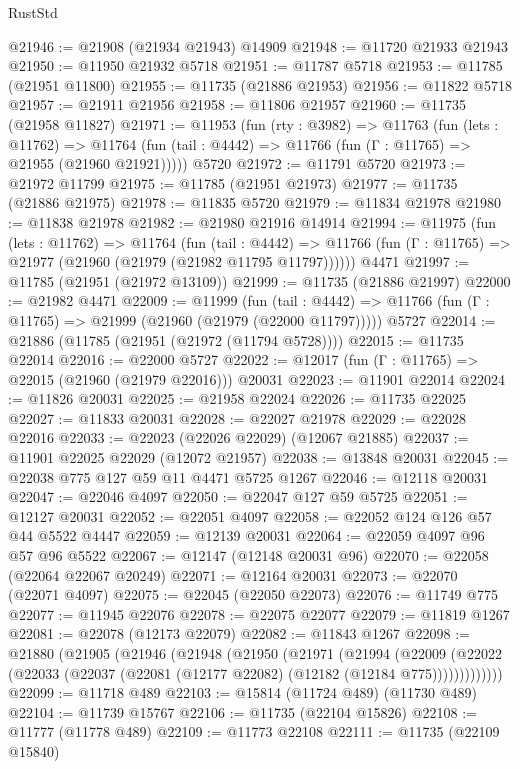 \begin{lexlean}{RustStd}
\begin{coremodule}
@21946 := @21908 (@21934 @21943) @14909
@21948 := @11720 @21933 @21943
@21950 := @11950 @21932 @5718
@21951 := @11787 @5718
@21953 := @11785 (@21951 @11800)
@21955 := @11735 (@21886 @21953)
@21956 := @11822 @5718
@21957 := @21911 @21956
@21958 := @11806 @21957
@21960 := @11735 (@21958 @11827)
@21971 := @11953
    (fun (rty : @3982) =>
    @11763
      (fun (lets : @11762) =>
      @11764 (fun (tail : @4442) => @11766 (fun (Γ : @11765) => @21955 (@21960 @21921)))))
    @5720
@21972 := @11791 @5720
@21973 := @21972 @11799
@21975 := @11785 (@21951 @21973)
@21977 := @11735 (@21886 @21975)
@21978 := @11835 @5720
@21979 := @11834 @21978
@21980 := @11838 @21978
@21982 := @21980 @21916 @14914
@21994 := @11975
    (fun (lets : @11762) =>
    @11764
      (fun (tail : @4442) =>
      @11766 (fun (Γ : @11765) => @21977 (@21960 (@21979 (@21982 @11795 @11797))))))
    @4471
@21997 := @11785 (@21951 (@21972 @13109))
@21999 := @11735 (@21886 @21997)
@22000 := @21982 @4471
@22009 := @11999
    (fun (tail : @4442) => @11766 (fun (Γ : @11765) => @21999 (@21960 (@21979 (@22000 @11797)))))
    @5727
@22014 := @21886 (@11785 (@21951 (@21972 (@11794 @5728))))
@22015 := @11735 @22014
@22016 := @22000 @5727
@22022 := @12017 (fun (Γ : @11765) => @22015 (@21960 (@21979 @22016))) @20031
@22023 := @11901 @22014
@22024 := @11826 @20031
@22025 := @21958 @22024
@22026 := @11735 @22025
@22027 := @11833 @20031
@22028 := @22027 @21978
@22029 := @22028 @22016
@22033 := @22023 (@22026 @22029) (@12067 @21885)
@22037 := @11901 @22025 @22029 (@12072 @21957)
@22038 := @13848 @20031
@22045 := @22038 @775 @127 @59 @11 @4471 @5725 @1267
@22046 := @12118 @20031
@22047 := @22046 @4097
@22050 := @22047 @127 @59 @5725
@22051 := @12127 @20031
@22052 := @22051 @4097
@22058 := @22052 @124 @126 @57 @44 @5522 @4447
@22059 := @12139 @20031
@22064 := @22059 @4097 @96 @57 @96 @5522
@22067 := @12147 (@12148 @20031 @96)
@22070 := @22058 (@22064 @22067 @20249)
@22071 := @12164 @20031
@22073 := @22070 (@22071 @4097)
@22075 := @22045 (@22050 @22073)
@22076 := @11749 @775
@22077 := @11945 @22076
@22078 := @22075 @22077
@22079 := @11819 @1267
@22081 := @22078 (@12173 @22079)
@22082 := @11843 @1267
@22098 := @21880
    (@21905
      (@21946
        (@21948
          (@21950
            (@21971
              (@21994
                (@22009
                  (@22022 (@22033 (@22037 (@22081 (@12177 @22082) (@12182 (@12184 @775)))))))))))))
@22099 := @11718 @489
@22103 := @15814 (@11724 @489) (@11730 @489)
@22104 := @11739 @15767
@22106 := @11735 (@22104 @15826)
@22108 := @11777 (@11778 @489)
@22109 := @11773 @22108
@22111 := @11735 (@22109 @15840)

\end{coremodule}
\end{lexlean}

